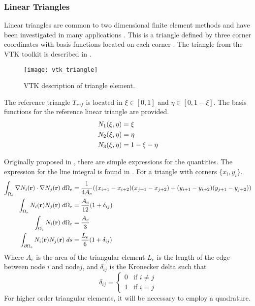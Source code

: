     \subsubsection{Linear Triangles}
      Linear triangles are common to two dimensional finite element methods and
      have been investigated in many applications \cite{Hosseini2017} 
      \cite{Hosseini2013} \cite{Hosseini2015}. This is a triangle  defined by
      three corner coordinates with basis functions located on each corner
      \cite{vtk}. The triangle from the VTK toolkit is described in 
       \cite{vtk}.
      \begin{figure}
        \centering
        \texttt{[image: vtk\_triangle]}
        \caption{VTK description of triangle element.}
        \label{fig:vtk_triangle}
      \end{figure}
      The reference triangle $T_{ref}$ is located in
      $\xi \in [0,1]$ and $\eta \in [0,1-\xi]$. The basis functions for the 
      reference linear triangle are provided.
      \begin{align}
        N_1(\xi,\eta) &= \xi \\
        N_2(\xi,\eta) &= \eta \\
        N_3(\xi,\eta) &= 1-\xi-\eta
      \end{align}
      
      Originally proposed in \cite{textbookwhite}, there are simple expressions
      for the quantities. The expression for the line integral is found in 
      \cite{computerLab}. For a triangle with corners $\{ x_i,y_i \}$.
      \begin{align}
        \int_{\Omega_e} \mathbf{\nabla} N_i(\mathbf{r}) \cdot \mathbf{\nabla} N_j(\mathbf{r}) 
          \;d\Omega_e &= \frac{1}{4 A_e}
          ((x_{i+1}-x_{i+2})(x_{j+1}-x_{j+2}) + 
          (y_{i+1}-y_{i+2})(y_{j+1}-y_{j+2})) \\
        \int_{\Omega_e} N_i(\mathbf{r}) N_j(\mathbf{r}) \;d\Omega_e &= 
          \frac{A_e}{12} (1+\delta_{ij}) \\
        \int_{\Omega_e} N_i(\mathbf{r}) \;d\Omega_e &= \frac{A_e}{3} \\
        \int_{\partial \Omega_e} N_i(\mathbf{r}) N_j(\mathbf{r}) \;ds &=
          \frac{L_e}{6}(1+\delta_{ij}) 
      \end{align}
      Where $A_e$ is the area of the triangular element $L_e$ is the length of 
      the edge between node $i$ and node$j$, and $\delta_{ij}$ is the Kronecker
      delta such that
      \begin{equation} \label{eq:kroneker_delta}
        \delta_{ij} =
        \begin{cases}
          0 & \text{if } i \ne j \\
          1 & \text{if } i = j
        \end{cases}
      \end{equation}
      For higher order triangular elements, it will be necessary to employ a 
      quadrature.
